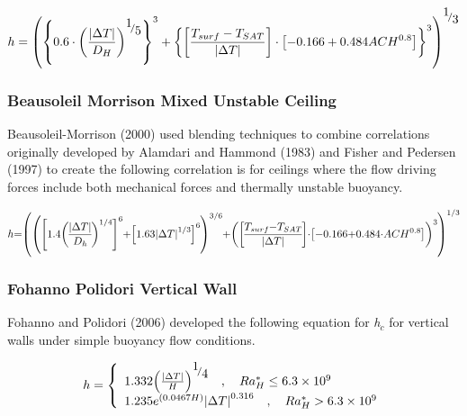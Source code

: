 \begin{equation}
h = {\left( {{{\left\{ {0.6 \cdot {{\left( {\frac{{\left| {\Delta T} \right|}}{{{D_H}}}} \right)}^{{\raise0.7ex\hbox{1} \!\mathord{\left/ {\vphantom {1 5}}\right.}\!\lower0.7ex\hbox{5}}}}} \right\}}^3} + {{\left\{ {\left[ {\frac{{{T_{surf}} - {T_{SAT}}}}{{\left| {\Delta T} \right|}}} \right]\cdot\left[ { - 0.166 + 0.484AC{H^{0.8}}} \right]} \right\}}^3}} \right)^{{\raise0.7ex\hbox{1} \!\mathord{\left/ {\vphantom {1 3}}\right.}\!\lower0.7ex\hbox{3}}}}
\end{equation}

\subsubsection{Beausoleil Morrison Mixed Unstable Ceiling}\label{beausoleil-morrison-mixed-unstable-ceiling}

Beausoleil-Morrison (2000) used blending techniques to combine correlations originally developed by Alamdari and Hammond (1983) and Fisher and Pedersen (1997) to create the following correlation is for ceilings where the flow driving forces include both mechanical forces and thermally unstable buoyancy.

\begin{equation}
\medmuskip=0mu
\thinmuskip=0mu
\thickmuskip=0mu
\nulldelimiterspace=0pt
\scriptspace=0pt
h = \left(
   \left(
    \left[
     1.4 \left(
      \frac{
       \left|
        \Delta T
       \right|
      }{
       D_h
      }
     \right)^{1/4}
    \right]^6 +
    \left[
     1.63 \left|\Delta T\right|^{1/3}
    \right]^6
   \right)^{3/6} +
   \left(
    \left[
     \frac{
      T_{surf}-T_{SAT}
     }{
      \left|\Delta T\right|
     }
    \right]
    \cdot
    \left[
     -0.166 + 0.484 \cdot ACH^{0.8}
    \right]
   \right)^3
  \right)^{1/3}
\end{equation}

\subsubsection{Fohanno Polidori Vertical Wall}\label{fohanno-polidori-vertical-wall}

Fohanno and Polidori (2006) developed the following equation for \emph{h\(_{c}\)} for vertical walls under simple buoyancy flow conditions.

\begin{equation}
h = \left\{ \begin{array}{l}1.332{\left( {\frac{{\left| {\Delta T} \right|}}{H}} \right)^{{\raise0.7ex\hbox{1} \!\mathord{\left/ {\vphantom {1 4}}\right.}\!\lower0.7ex\hbox{4}}}}\quad ,\quad Ra_H^* \le 6.3 \times {10^9}\\1.235{e^{\left( {0.0467H} \right)}}{\left| {\Delta T} \right|^{0.316}}\quad ,\quad Ra_H^* > 6.3 \times {10^9}\end{array} \right.
\end{equation}

